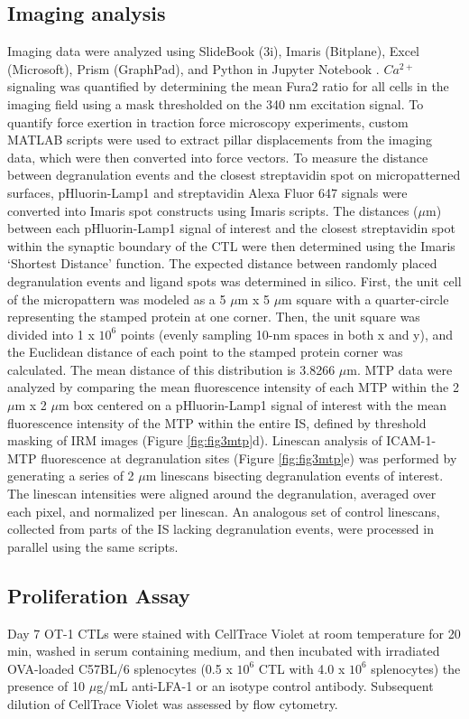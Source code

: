 \subsection{Imaging analysis}
Imaging data were analyzed using SlideBook (3i), Imaris (Bitplane), Excel (Microsoft), Prism (GraphPad), and Python in Jupyter Notebook \cite{Kluyver2016}. $Ca^{2+}$ signaling was quantified by determining the mean Fura2 ratio for all cells in the imaging field using a mask thresholded on the 340 nm excitation signal. To quantify force exertion in traction force microscopy experiments, custom MATLAB scripts were used to extract pillar displacements from the imaging data, which were then converted into force vectors. To measure the distance between degranulation events and the closest streptavidin spot on micropatterned surfaces, pHluorin-Lamp1 and streptavidin Alexa Fluor 647 signals were converted into Imaris spot constructs using Imaris scripts. The distances ($\mu$m) between each pHluorin-Lamp1 signal of interest and the closest streptavidin spot within the synaptic boundary of the CTL were then determined using the Imaris ‘Shortest Distance’ function. The expected distance between randomly placed degranulation events and ligand spots was determined in silico. First, the unit cell of the micropattern was modeled as a 5 $\mu$m x 5 $\mu$m square with a quarter-circle representing the stamped protein at one corner. Then, the unit square was divided into 1 x $10^{6}$ points (evenly sampling 10-nm spaces in both x and y), and the Euclidean distance of each point to the stamped protein corner was calculated. The mean distance of this distribution is 3.8266 $\mu$m. MTP data were analyzed by comparing the mean fluorescence intensity of each MTP within the 2 $\mu$m x 2 $\mu$m box centered on a pHluorin-Lamp1 signal of interest with the mean fluorescence intensity of the MTP within the entire IS, defined by threshold masking of IRM images (Figure \ref{fig:fig3mtp}d). Linescan analysis of ICAM-1-MTP fluorescence at degranulation sites (Figure \ref{fig:fig3mtp}e) was performed by generating a series of 2 $\mu$m linescans bisecting degranulation events of interest. The linescan intensities were aligned around the degranulation, averaged over each pixel, and normalized per linescan. An analogous set of control linescans, collected from parts of the IS lacking degranulation events, were processed in parallel using the same scripts.

\subsection{Proliferation Assay}
Day 7 OT-1 CTLs were stained with CellTrace Violet at room temperature for 20 min, washed in serum containing medium, and then incubated with irradiated OVA-loaded C57BL/6 splenocytes (0.5 x $10^{6}$ CTL with 4.0 x $10^{6}$ splenocytes) the presence of 10 $\mu$g/mL anti-LFA-1 or an isotype control antibody. Subsequent dilution of CellTrace Violet was assessed by flow cytometry.


